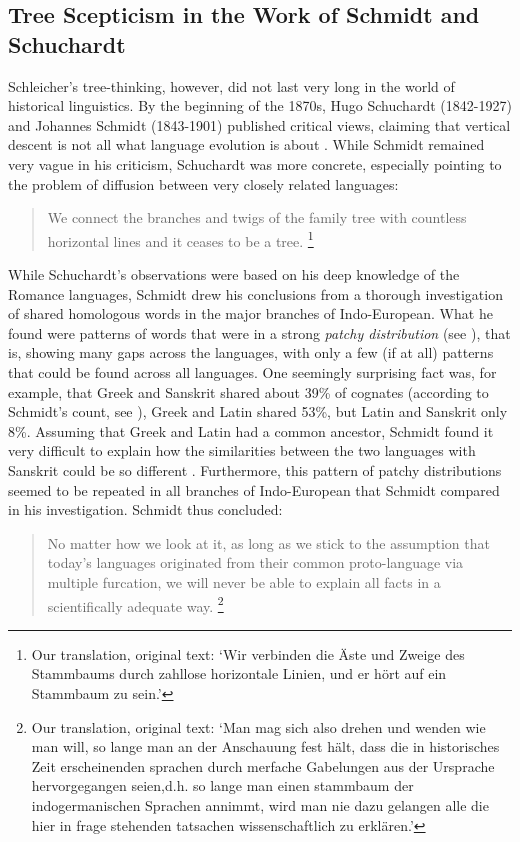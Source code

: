\documentclass[svgnames,12pt]{scrartcl}
\begin{document}
{\subsection{Tree Scepticism in the Work of Schmidt and Schuchardt}
Schleicher's tree-thinking, however, did not last very long in the world of historical linguistics.
By the beginning of the 1870s, Hugo Schuchardt (1842-1927) and Johannes Schmidt (1843-1901) published
critical views, claiming that vertical descent is not all what language evolution is about
\citep{Schmidt1872,Schuchardt1870}. While Schmidt remained very vague in his criticism, Schuchardt
was more concrete, especially pointing to the problem of diffusion
between very closely related languages: 

\begin{quote}
\small We connect the branches and twigs of the family tree with countless horizontal lines and it ceases
to be a tree. \citep[9]{Schuchardt1870}\footnote{Our translation, original text: `Wir verbinden die
Äste und Zweige des Stammbaums durch zahllose horizontale Linien, und er hört auf ein Stammbaum zu
sein.'} 
\end{quote}

While Schuchardt's observations were based on his deep knowledge of the Romance languages, Schmidt
drew his conclusions from a thorough investigation of shared homologous words in the major branches
of Indo-European. What he found were patterns of words that were in a strong \emph{patchy
distribution} (see \citealt{List2014a}), that is, showing many gaps across the languages, with only
a few (if at all) patterns that could be found across all languages. One seemingly surprising fact
was, for example, that Greek and Sanskrit shared about 39\% of cognates (according to Schmidt's
count, see \citealt{Geisler2013}), Greek and Latin shared 53\%, but Latin and Sanskrit only 8\%.
Assuming that Greek and Latin had a common ancestor, Schmidt found it very difficult to explain how
the similarities between the two languages with Sanskrit could be so different
\citep[24]{Schmidt1872}. Furthermore, this pattern of patchy distributions seemed to be repeated in
all branches of Indo-European that Schmidt compared in his investigation. Schmidt thus concluded: 

\begin{quote}
     \small No matter how we look at it, as long as we stick to the assumption that today's languages
     originated from their common proto-language via multiple furcation, we will never be able to
     explain all facts in a scientifically adequate way. \citep[17]{Schmidt1872}\footnote{Our
     translation, original text: `Man mag sich also drehen und wenden wie man will, so lange man an
     der Anschauung fest hält, dass die in historisches Zeit erscheinenden sprachen durch merfache
     Gabelungen aus der Ursprache hervorgegangen seien,d.h. so lange man einen stammbaum der
     indogermanischen Sprachen annimmt, wird man nie dazu gelangen alle die hier in frage stehenden
     tatsachen wissenschaftlich zu erklären.'} 
\end{quote}

}
\end{document}
